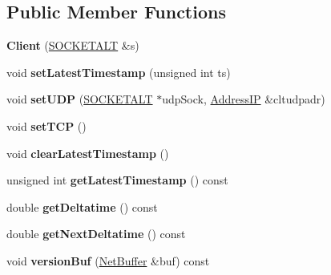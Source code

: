 \subsection*{Public Member Functions}
\begin{DoxyCompactItemize}
\item 
{\bfseries Client} (\hyperlink{classSOCKETALT}{S\+O\+C\+K\+E\+T\+A\+LT} \&s)\hypertarget{classClient_acd7d5b6eec101992240ff0c8d47c4188}{}\label{classClient_acd7d5b6eec101992240ff0c8d47c4188}

\item 
void {\bfseries set\+Latest\+Timestamp} (unsigned int ts)\hypertarget{classClient_abbffaaffa2faeb0b15fe03716b4b803d}{}\label{classClient_abbffaaffa2faeb0b15fe03716b4b803d}

\item 
void {\bfseries set\+U\+DP} (\hyperlink{classSOCKETALT}{S\+O\+C\+K\+E\+T\+A\+LT} $\ast$udp\+Sock, \hyperlink{structAddressIP}{Address\+IP} \&cltudpadr)\hypertarget{classClient_a205f767e9f56159def2e174a053d4537}{}\label{classClient_a205f767e9f56159def2e174a053d4537}

\item 
void {\bfseries set\+T\+CP} ()\hypertarget{classClient_af51bfccefa83244291f5f9c170424da2}{}\label{classClient_af51bfccefa83244291f5f9c170424da2}

\item 
void {\bfseries clear\+Latest\+Timestamp} ()\hypertarget{classClient_a0e67944489a846ea54ceae0aa72654d7}{}\label{classClient_a0e67944489a846ea54ceae0aa72654d7}

\item 
unsigned int {\bfseries get\+Latest\+Timestamp} () const \hypertarget{classClient_a90aa7f8c5b14cb2dc6eae6ea40115932}{}\label{classClient_a90aa7f8c5b14cb2dc6eae6ea40115932}

\item 
double {\bfseries get\+Deltatime} () const \hypertarget{classClient_a2528d321ac32c5e05f7771e13accf2bb}{}\label{classClient_a2528d321ac32c5e05f7771e13accf2bb}

\item 
double {\bfseries get\+Next\+Deltatime} () const \hypertarget{classClient_a8496201e21857d6135ffdd427a76a179}{}\label{classClient_a8496201e21857d6135ffdd427a76a179}

\item 
void {\bfseries version\+Buf} (\hyperlink{classNetBuffer}{Net\+Buffer} \&buf) const \hypertarget{classClient_ad736d712b801daa8b9380748ece4aec7}{}\label{classClient_ad736d712b801daa8b9380748ece4aec7}

\end{DoxyCompactItemize}
